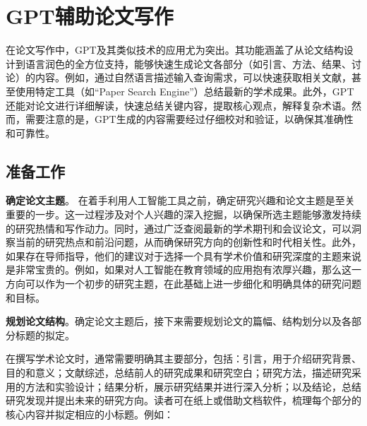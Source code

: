 \section{GPT辅助论文写作}

在论文写作中，GPT及其类似技术的应用尤为突出。其功能涵盖了从论文结构设计到语言润色的全方位支持，能够快速生成论文各部分（如引言、方法、结果、讨论）的内容。例如，通过自然语言描述输入查询需求，可以快速获取相关文献，甚至使用特定工具（如“Paper Search Engine”）总结最新的学术成果。此外，GPT还能对论文进行详细解读，快速总结关键内容，提取核心观点，解释复杂术语。然而，需要注意的是，GPT生成的内容需要经过仔细校对和验证，以确保其准确性和可靠性。

\subsection{准备工作}
\textbf{确定论文主题}。
在着手利用人工智能工具之前，确定研究兴趣和论文主题是至关重要的一步。这一过程涉及对个人兴趣的深入挖掘，以确保所选主题能够激发持续的研究热情和写作动力。同时，通过广泛查阅最新的学术期刊和会议论文，可以洞察当前的研究热点和前沿问题，从而确保研究方向的创新性和时代相关性。此外，如果存在导师指导，他们的建议对于选择一个具有学术价值和研究深度的主题来说是非常宝贵的。例如，如果对人工智能在教育领域的应用抱有浓厚兴趣，那么这一方向可以作为一个初步的研究主题，在此基础上进一步细化和明确具体的研究问题和目标。


\textbf{规划论文结构}。确定论文主题后，接下来需要规划论文的篇幅、结构划分以及各部分标题的拟定。

在撰写学术论文时，通常需要明确其主要部分，包括：引言，用于介绍研究背景、目的和意义；文献综述，总结前人的研究成果和研究空白；研究方法，描述研究采用的方法和实验设计；结果分析，展示研究结果并进行深入分析；以及结论，总结研究发现并提出未来的研究方向。读者可在纸上或借助文档软件，梳理每个部分的核心内容并拟定相应的小标题。例如：

